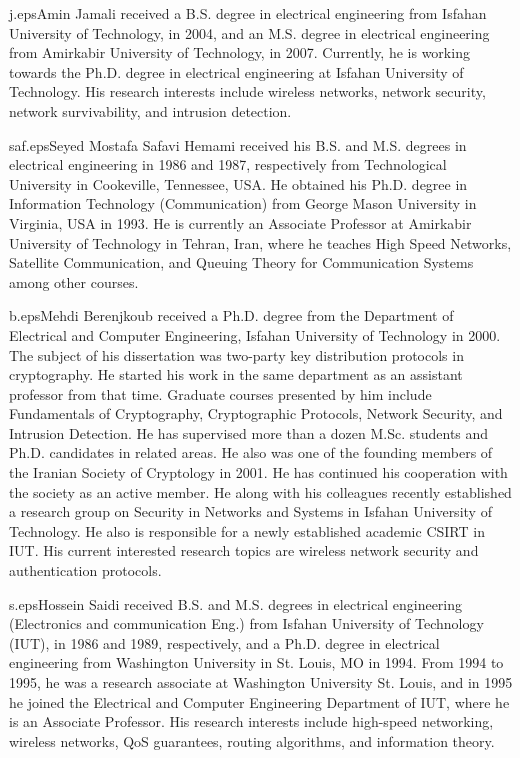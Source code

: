 \documentclass[10pt,twocolumn,oneside,submit]{JCNtran}
\begin{document}
\epsfysize=3.2cm
\begin{biography}{j.eps}{Amin Jamali} received a B.S. degree in electrical engineering from Isfahan University of Technology, in 2004, and an M.S. degree in electrical engineering from Amirkabir University of Technology, in 2007. Currently, he is working towards the Ph.D. degree in electrical engineering at Isfahan University of Technology. His research interests include wireless networks, network security, network survivability, and intrusion detection.
\end{biography}

\epsfysize=3.2cm
\begin{biography}{saf.eps}{Seyed Mostafa Safavi Hemami} received his B.S. and M.S. degrees in electrical engineering in 1986 and 1987, respectively from Technological University in Cookeville, Tennessee, USA. He obtained his Ph.D. degree in Information Technology (Communication) from George Mason University in Virginia, USA in 1993. He is currently an Associate Professor at Amirkabir University of Technology in Tehran, Iran, where he teaches High Speed Networks, Satellite Communication, and Queuing Theory for Communication Systems among other courses.
\end{biography}

\epsfysize=3.2cm
\begin{biography}{b.eps}{Mehdi Berenjkoub} received a Ph.D. degree from the Department of Electrical and Computer Engineering, Isfahan University of Technology in 2000. The subject of his dissertation was two-party key distribution protocols in cryptography. He started his work in the same department as an assistant professor from that time. Graduate courses presented by him include Fundamentals of Cryptography, Cryptographic Protocols, Network Security, and Intrusion Detection. He has supervised more than a dozen M.Sc. students and Ph.D. candidates in related areas. He also was one of the founding members of the Iranian Society of Cryptology in 2001. He has continued his cooperation with the society as an active member. He along with his colleagues recently established a research group on Security in Networks and Systems in Isfahan University of Technology. He also is responsible for a newly established academic CSIRT in IUT. His current interested research topics are wireless network security and authentication protocols.
\end{biography}

\epsfysize=3.2cm
\begin{biography}{s.eps}{Hossein Saidi} received B.S. and M.S. degrees in electrical engineering (Electronics and communication Eng.) from Isfahan University of Technology (IUT), in 1986 and 1989, respectively, and a Ph.D. degree in electrical engineering from Washington University in St. Louis, MO in 1994. From 1994 to 1995, he was a research associate at Washington University St. Louis, and in 1995 he joined the Electrical and Computer Engineering Department of IUT, where he is an Associate Professor. His research interests include high-speed networking, wireless networks, QoS guarantees, routing algorithms, and information theory.
\end{biography}
\end{document}
